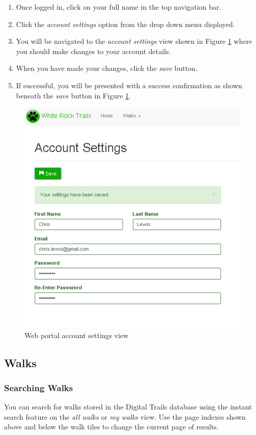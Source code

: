 \documentclass[11pt,a4paper]{report}
\begin{document}
\begin{enumerate}
\item Once logged in, click on your full name in the top navigation bar.
\item Click the \emph{account settings} option from the drop down menu displayed.
\item You will be navigated to the \emph{account settings} view shown in Figure \ref{fig:user-account-guide} where you should make changes to your account details.
\item When you have made your changes, click the \emph{save} button.
\item If successful, you will be presented with a success confirmation as shown beneath the \emph{save} button in Figure \ref{fig:user-account-guide}.
\end{enumerate}

\begin{figure}[h]
\centering
\includegraphics[width=0.7\linewidth]{./img/webportal/user-account}
\caption{Web portal account settings view}
\label{fig:user-account-guide}
\end{figure}

\subsection{Walks}

\subsubsection{Searching Walks}

You can search for walks stored in the Digital Trails database using the instant search feature on the \emph{all walks} or \emph{my walks} view. Use the page indexes shown above and below the walk tiles to change the current page of results.
\end{document}
